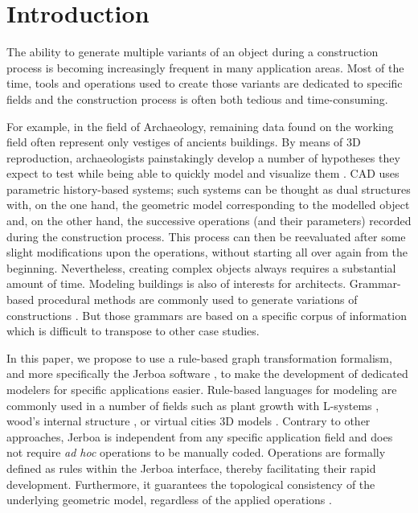 \section{Introduction}
\copyrightspace

The ability to generate multiple variants of an object during a construction process is  becoming increasingly frequent in many application areas. Most of the time, tools and operations used to create those variants are dedicated to specific fields and the construction process is often both tedious and time-consuming.

For example, in the field of Archaeology, remaining data found on the working field often represent only vestiges of ancients buildings. By means of 3D
reproduction, archaeologists painstakingly develop a number of hypotheses
they expect to test while being able to quickly model and
visualize them \cite{Quattrini_Baleani_2015}. CAD uses parametric history-based systems; such systems can be thought as dual structures with,  on the one hand, the geometric model corresponding to the modelled
object and,  on the other hand, the successive operations (and their parameters) recorded during the construction process. This process can then be reevaluated after some slight modifications upon the operations, without starting all over again from the beginning. Nevertheless, creating complex objects always requires a substantial amount of time.
Modeling buildings is also of interests for architects. Grammar-based procedural methods are commonly used
to generate variations of constructions \cite{haegler2009procedural, muller2006procedural}. But those grammars are based on a specific corpus of information which is difficult to transpose to other case studies.

In this paper, we propose to use  a rule-based graph transformation formalism, and more specifically the Jerboa software \cite{belhaouari2014jerboa}, to make the development of dedicated modelers for
specific applications easier. Rule-based languages for modeling 
are commonly used in a number of fields such as plant growth with L-systems \cite{lindenmayer1974adding, bohl2015modeling}, wood's internal structure \cite{terraz20093gmap}, or virtual cities 3D models
\cite{esri2023cityengine, beirao2010implementing}. Contrary to other approaches, Jerboa is independent from any specific
application field and does not require \textit{ad hoc} operations to
be manually coded. Operations are formally defined as rules within the Jerboa interface, thereby facilitating their rapid development. Furthermore, it guarantees the topological %
consistency of the underlying geometric model, 
 regardless of the applied operations \cite{arnould2022preserving}.

